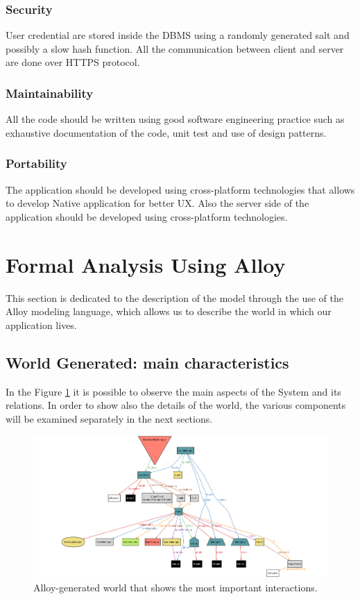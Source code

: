\documentclass[a4paper, 12pt, oneside]{article}
\begin{document}
\subsubsection{Security}
User credential are stored inside the DBMS using a randomly generated salt and possibly a slow hash function. All the communication between client and server are done over HTTPS protocol.  
\subsubsection{Maintainability}
All the code should be written using good software engineering practice such as exhaustive documentation of the code, unit test and use of design patterns.
\subsubsection{Portability}
The application should be developed using cross-platform technologies that allows to develop Native application for better UX.
Also the server side of the application should be developed using cross-platform technologies.

\newpage
\section{Formal Analysis Using Alloy}
\label{analysisAndAlloy}
This section is dedicated to the description of the model through the use of the Alloy modeling language, which allows us to describe the world in which our application lives.

\subsection{World Generated: main characteristics}
In the Figure \ref{alloy_world} it is possible to observe the main aspects of the System and its relations. In order to show also the details of the world, the various components will be examined separately in the next sections.
\begin{figure}[h!]
\centering
	\centering
  	\includegraphics[height=0.32\textheight, scale=0.3, keepaspectratio]{img/alloy/alloy_world.png}
	\caption{Alloy-generated world that shows the most important interactions.}
 	\label{alloy_world}
\end{figure}
\end{document}
